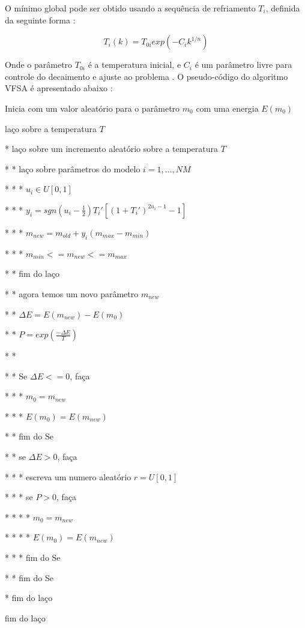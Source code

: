 O mínimo global pode ser obtido usando a sequência de refriamento $T_i$, definida da seguinte forma \cite{ingber}:

\begin{equation}
\label{eq:3.8}
 T_i(k)=T_{0i}exp(-C_ik^{1/n})
\end{equation}

Onde o parâmetro $T_{0i}$ é a temperatura inicial, e $C_i$ é um parâmetro livre para controle do decaimento e ajuste ao
problema \cite{klaus}. O pseudo-código do algoritmo VFSA é apresentado abaixo \cite{stoffa}:

\vspace{\onelineskip} 

Inicia com um valor aleatório para o parâmetro $m_0$ com uma energia $E(m_0)$

laço sobre a temperatura $T$

* laço sobre um incremento aleatório sobre a temperatura $T$

* * laço sobre parâmetros do modelo $i=1,...,NM$

* * * $u_i \in U[0,1]$

* * * $y_i=sgn(u_i-\frac{1}{2})T_i'[(1+T_i')^{2u_i-1}-1]$

* * * $m_{new}=m_{old}+y_i(m_{max}-m_{min})$

* * * $m_{min}<=m_{new}<=m_{max}$

* * fim do laço

* * agora temos um novo parâmetro $m_{new}$

* * $\Delta E=E(m_{new})-E(m_0)$

* * $P=exp(\frac{-\Delta E}{T})$

* *

* * Se $\Delta E <= 0$, faça

* * * $m_0=m_{new}$

* * * $E(m_0)=E(m_{new})$

* * fim do Se

* * se $\Delta E > 0$, faça

* * * escreva um numero aleatório $r=U[0,1]$

* * * se $P > 0$, faça

* * * * $m_0=m_{new}$

* * * * $E(m_0)=E(m_{new})$

* * * fim do Se

* * fim do Se

* fim do laço

fim do laço

\vspace{\onelineskip} 

